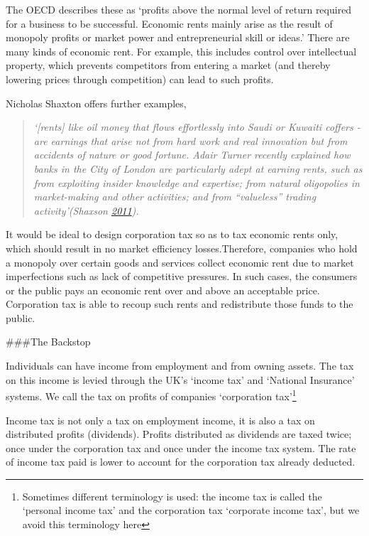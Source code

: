 \documentclass[]{tufte-handout}
\begin{document}
The OECD describes these as `profits above the normal level of return
required for a business to be successful. Economic rents mainly arise as
the result of monopoly profits or market power and entrepreneurial skill
or ideas.' There are many kinds of economic rent. For example, this
includes control over intellectual property, which prevents competitors
from entering a market (and thereby lowering prices through competition)
can lead to such profits.

Nicholas Shaxton offers further examples,

\begin{quote}
\emph{`{[}rents{]} like oil money that flows effortlessly into Saudi or
Kuwaiti coffers - are earnings that arise not from hard work and real
innovation but from accidents of nature or good fortune. Adair Turner
recently explained how banks in the City of London are particularly
adept at earning rents, such as from exploiting insider knowledge and
expertise; from natural oligopolies in market-making and other
activities; and from ``valueless'' trading activity'(Shaxson
\protect\hyperlink{ref-Shaxson2011}{2011}).}
\end{quote}

It would be ideal to design corporation tax so as to tax economic rents
only, which should result in no market efficiency losses.Therefore,
companies who hold a monopoly over certain goods and services collect
economic rent due to market imperfections such as lack of competitive
pressures. In such cases, the consumers or the public pays an economic
rent over and above an acceptable price. Corporation tax is able to
recoup such rents and redistribute those funds to the public.

\#\#\#The Backstop

Individuals can have income from employment and from owning assets. The
tax on this income is levied through the UK's `income tax' and `National
Insurance' systems. We call the tax on profits of companies `corporation
tax'\footnote{Sometimes different terminology is used: the income tax is
  called the `personal income tax' and the corporation tax `corporate
  income tax', but we avoid this terminology here}

Income tax is not only a tax on employment income, it is also a tax on
distributed profits (dividends). Profits distributed as dividends are
taxed twice; once under the corporation tax and once under the income
tax system. The rate of income tax paid is lower to account for the
corporation tax already deducted.
\end{document}
